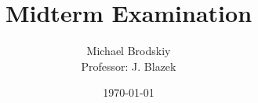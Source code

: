 


\title{Midterm Examination}
\date{\today}
\author{Michael Brodskiy\\ \small Professor: J. Blazek}



\maketitle

